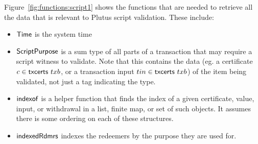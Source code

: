 Figure~\ref{fig:functions:script1} shows the functions that are needed to
retrieve all the data that is relevant to Plutus script validation.
These include:

\begin{itemize}
\item $\mathsf{Time}$ is the system time
\item
  $\mathsf{ScriptPurpose}$ is a sum type of all parts of a transaction that may
  require a script witness to validate. Note that this contains the data
  (eg. a certificate $c \in \mathsf{txcerts}~{txb}$,
  or a transaction input $tin \in \mathsf{txcerts}~{txb}$) of the item being validated,
  not just a tag indicating the type.
\item
  $\mathsf{indexof}$ is a helper function that finds the index of a given certificate, value, input, or
  withdrawal in a list, finite map, or set of such objects.
  It assumes there is some ordering on each of these structures.
\item
  $\mathsf{indexedRdmrs}$ indexes the redeemers by the purpose they are used for.
\end{itemize}


